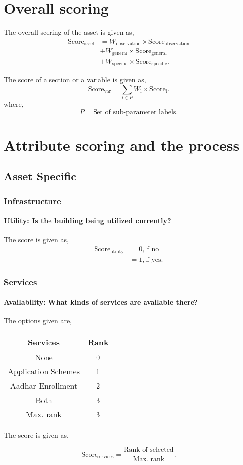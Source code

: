 \documentclass[oneside,twocolumn]{article}
\newcommand{\tsub}[2]{\text{#1}_{\text{#2}}}
\newcommand{\tsubb}[2]{#1_{\text{#2}}}
\newcommand{\dsub}[2]{\dfrac{\text{#1}}{\text{#2}}}
\newcommand{\singsel}[1]
{
	\[
		\tsub{Score}{#1} = \dsub{Rank of selected}{Max. rank}.
	\]
}
\newenvironment{ttable}
{
\begin{center}
\begin{tabular}{c|c}
\hline
}
{
\\ \hline
\end{tabular}
\end{center}
}
\begin{document}
\section{Overall scoring}
The overall scoring of the asset is given as,
\begin{align*}
	\tsub{Score}{asset} &= \tsubb{W}{observation} \times \tsub{Score}{observation} \\
	&+ \tsubb{W}{general} \times \tsub{Score}{general} \\
	&+ \tsubb{W}{specific} \times \tsub{Score}{specific}.
\end{align*}

The score of a section or a variable is given as,
\[
	\tsub{Score}{var} = \sum_{l \in P} \tsubb{W}{l} \times \tsub{Score}{l}.
\]
where,
\[
	P = \text{Set of sub-parameter labels.}
\]	

\section{Attribute scoring and the process}
\subsection{Asset Specific}
\subsubsection{Infrastructure}
\paragraph{Utility: Is the building being utilized currently?}
The score is given as,
\begin{align*}
	\tsub{Score}{utility} &= 0, \text{if no} \\
	&= 1, \text{if yes}.
\end{align*}
\subsubsection{Services}
\paragraph{Availability:  What kinds of services are available there?}
The options given are,
\begin{ttable}
	Services & Rank \\ \hline
	None & 0 \\
	Application Schemes & 1 \\
	Aadhar Enrollment & 2 \\
	Both & 3 \\ \hline
	Max. rank & 3
\end{ttable}
The score is given as,
\singsel{services}
\end{document}
